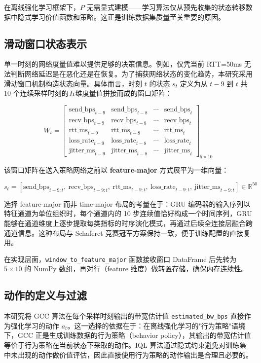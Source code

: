 在离线强化学习框架下，$P$ 无需显式建模——学习算法仅从预先收集的状态转移数据中隐式学习价值函数和策略。这正是训练数据集质量至关重要的原因。

\subsection{滑动窗口状态表示}

单一时刻的网络度量值难以提供足够的决策信息。例如，仅凭当前 RTT=50ms 无法判断网络延迟是在恶化还是在恢复。为了捕获网络状态的变化趋势，本研究采用滑动窗口机制构造状态向量。具体而言，时刻 $t$ 的状态 $s_t$ 定义为从 $t-9$ 到 $t$ 共 10 个连续采样时刻的五维度量值拼接而成的窗口矩阵：

\[
W_t = \begin{bmatrix}\text{send\_bps}_{t-9} & \text{send\_bps}_{t-8} & \cdots & \text{send\_bps}_t \\\text{recv\_bps}_{t-9} & \text{recv\_bps}_{t-8} & \cdots & \text{recv\_bps}_t \\\text{rtt\_ms}_{t-9} & \text{rtt\_ms}_{t-8} & \cdots & \text{rtt\_ms}_t \\\text{loss\_rate}_{t-9} & \text{loss\_rate}_{t-8} & \cdots & \text{loss\_rate}_t \\\text{jitter\_ms}_{t-9} & \text{jitter\_ms}_{t-8} & \cdots & \text{jitter\_ms}_t\end{bmatrix}_{5 \times 10}
\]

该窗口矩阵在送入策略网络之前以 \textbf{feature-major} 方式展平为一维向量：

\[
s_t = [\text{send\_bps}_{t-9:t},\ \text{recv\_bps}_{t-9:t},\ \text{rtt\_ms}_{t-9:t},\ \text{loss\_rate}_{t-9:t},\ \text{jitter\_ms}_{t-9:t}] \in \mathbb{R}^{50}
\]

选择 feature-major 而非 time-major 布局的考量在于：GRU 编码器的输入序列以特征通道为单位组织时，每个通道内的 10 步连续值恰好构成一个时间序列，GRU 能够在通道维度上逐步提取每类指标的时序演化模式，再通过后续全连接层融合跨通道信息。这种布局与 Schaferct 竞赛冠军方案保持一致，便于训练配置的直接复用。

在实现层面，\texttt{window\_to\_feature\_major} 函数接收窗口 DataFrame 后先转为 $5 \times 10$ 的 NumPy 数组，再对行（feature 维度）做转置存储，确保内存连续性。

\subsection{动作的定义与过滤}

本研究将 GCC 算法在每个采样时刻输出的带宽估计值 \texttt{estimated\_bw\_bps} 直接作为强化学习的动作 $a_t$。这一选择的依据在于：在离线强化学习的"行为策略"语境下，GCC 正是生成训练数据的行为策略（behavior policy），其输出的带宽估计值等价于行为策略在当前状态下采取的动作。IQL 算法通过隐式约束避免对训练集中未出现的动作做价值评估，因此直接使用行为策略的动作输出是合理且必要的。

